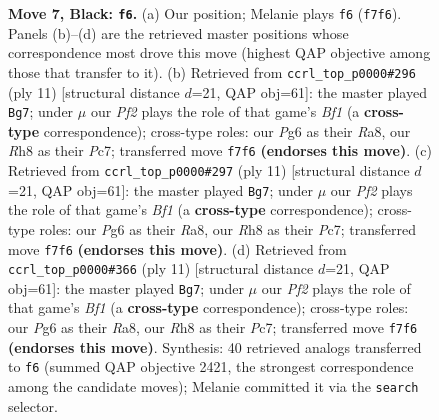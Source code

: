 \documentclass[11pt]{article}
\begin{document}
\begin{figure}[p]
\caption{\textbf{Move 7, Black: \texttt{f6}.} (a) Our position; Melanie plays \texttt{f6} (\texttt{f7f6}). Panels (b)--(d) are the retrieved master positions whose correspondence most drove this move (highest QAP objective among those that transfer to it). (b) Retrieved from \texttt{ccrl\_top\_p0000\#296} (ply 11) [structural distance $d$=21, QAP obj=61]: the master played \texttt{Bg7}; under $\mu$ our \emph{Pf2} plays the role of that game's \emph{Bf1} (a \textbf{cross-type} correspondence); cross-type roles: our \emph{P}g6 as their \emph{R}a8, our \emph{R}h8 as their \emph{P}c7; transferred move \texttt{f7f6} \textbf{(endorses this move)}. (c) Retrieved from \texttt{ccrl\_top\_p0000\#297} (ply 11) [structural distance $d$=21, QAP obj=61]: the master played \texttt{Bg7}; under $\mu$ our \emph{Pf2} plays the role of that game's \emph{Bf1} (a \textbf{cross-type} correspondence); cross-type roles: our \emph{P}g6 as their \emph{R}a8, our \emph{R}h8 as their \emph{P}c7; transferred move \texttt{f7f6} \textbf{(endorses this move)}. (d) Retrieved from \texttt{ccrl\_top\_p0000\#366} (ply 11) [structural distance $d$=21, QAP obj=61]: the master played \texttt{Bg7}; under $\mu$ our \emph{Pf2} plays the role of that game's \emph{Bf1} (a \textbf{cross-type} correspondence); cross-type roles: our \emph{P}g6 as their \emph{R}a8, our \emph{R}h8 as their \emph{P}c7; transferred move \texttt{f7f6} \textbf{(endorses this move)}. Synthesis: 40 retrieved analogs transferred to \texttt{f6} (summed QAP objective 2421, the strongest correspondence among the candidate moves); Melanie committed it via the \texttt{search} selector.}
\label{fig:thought-m13}
\end{figure}

\clearpage
\end{document}

